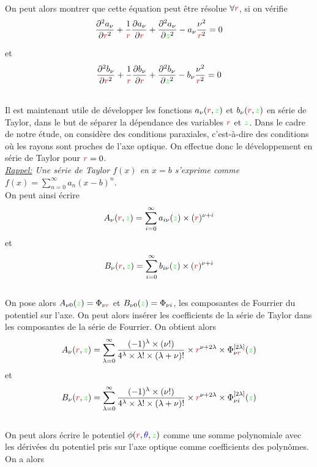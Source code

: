 \documentclass{article}
\begin{document}
\
\\
On peut alors montrer que cette équation peut être résolue $\forall {\color{red}r}$, si on vérifie
\[
\frac{\partial^{2} a_\nu}{\partial {\color{red}r}^2} + \frac{1}{{\color{red}r}} 
\frac{\partial a_\nu}{\partial {\color{red}r}} + \frac{\partial^{2} a_\nu}{\partial {\color{green}z}^2} - a_\nu \frac{\nu ^2}{{\color{red}r}^2}=0
\]

et 
\[
\frac{\partial^{2} b_\nu}{\partial {\color{red}r}^2} + \frac{1}{{\color{red}r}} \frac{\partial b_\nu}{\partial {\color{red}r}} 
+ \frac{\partial^{2} b_\nu}{\partial {\color{green}z}^2}- b_\nu \frac{\nu ^2}{{\color{red}r}^2}=0 
\]

\
\\
Il est maintenant utile de développer les fonctions $a_\nu ({\color{red}r},{\color{green}z})$ et $b_\nu ({\color{red}r},{\color{green}z})$
en série de Taylor, dans le but de séparer la dépendance des variables ${\color{red}r}$ et ${\color{green}z}$. 
Dans le cadre de notre étude, on considère des conditions paraxiales, c'est-à-dire des conditions où les rayons sont proches de l'axe optique. On effectue
donc le développement en série de Taylor pour ${\color{red}r}=0$.
\
\\
{\textit{
{\underline{Rappel:}} 
Une série de Taylor $f(x)$ en $x=b$ s'exprime comme $f(x)=\sum\limits_{n=0}^{\infty} a_n(x-b)^n$. 
}}
\
\\
On peut ainsi écrire 
\[
A_\nu ({\color{red}r},{\color{green}z})=\sum\limits_{i=0}^{\infty} a_{i\nu} ({\color{green}z}) \times ({\color{red}r})^{\nu + i}
\]
et 
\[
B_\nu ({\color{red}r},{\color{green}z})=\sum\limits_{i=0}^{\infty} b_{i\nu} ({\color{green}z}) \times ({\color{red}r})^{\nu + i}
\]
\
\\ 
On pose alors $A_{\nu 0} ({\color{green}z})=\Phi_{\nu {\color{red}r}}$ et $B_{\nu 0} ({\color{green}z})=\Phi_{\nu i}$, les composantes 
de Fourrier du potentiel sur l'axe. On peut alors insérer les coefficients de la série de Taylor dans les composantes de la série de 
Fourrier. On obtient alors 
\[
A_\nu ({\color{red}r},{\color{green}z})=\sum\limits_{\lambda=0}^{\infty} \frac{(-1)^{\lambda}\times (\nu !)}{4^{\lambda}\times \lambda !\times (\lambda +\nu)!}
\times {\color{red}r}^{\nu +2\lambda} \times \Phi_{\nu {\color{red}r}}^{[2\lambda]}({\color{green}z}) 
\]
et 
\[
B_\nu ({\color{red}r},{\color{green}z})=\sum\limits_{\lambda=0}^{\infty} \frac{(-1)^{\lambda}\times (\nu !)}{4^{\lambda}\times \lambda !\times (\lambda +\nu)!}
\times {\color{red}r}^{\nu +2\lambda} \times \Phi_{\nu i}^{[2\lambda]}({\color{green}z}) 
\]
\
\\
On peut alors écrire le potentiel $\phi ({\color{red}r},{\color{blue}\theta},{\color{green}z})$ comme une somme polynomiale avec les dérivées du potentiel pris sur 
l'axe optique comme coefficients des polynômes. On a alors 
\end{document}
